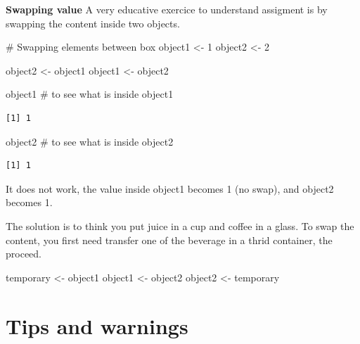 \documentclass[
  letterpaper,
  DIV=11,
  numbers=noendperiod]{scrreprt}
\newenvironment{Shaded}{\begin{snugshade}}{\end{snugshade}}
\newcommand{\CommentTok}[1]{\textcolor[rgb]{0.37,0.37,0.37}{#1}}
\newcommand{\DecValTok}[1]{\textcolor[rgb]{0.68,0.00,0.00}{#1}}
\newcommand{\NormalTok}[1]{\textcolor[rgb]{0.00,0.23,0.31}{#1}}
\newcommand{\OtherTok}[1]{\textcolor[rgb]{0.00,0.23,0.31}{#1}}
\begin{document}
\textbf{Swapping value} A very educative exercice to understand
assigment is by swapping the content inside two objects.

\begin{Shaded}
\begin{Highlighting}[]
\CommentTok{\# Swapping elements between box}
\NormalTok{object1 }\OtherTok{\textless{}{-}} \DecValTok{1}
\NormalTok{object2 }\OtherTok{\textless{}{-}} \DecValTok{2}

\NormalTok{object2 }\OtherTok{\textless{}{-}}\NormalTok{ object1}
\NormalTok{object1 }\OtherTok{\textless{}{-}}\NormalTok{ object2}

\NormalTok{object1 }\CommentTok{\# to see what is inside object1}
\end{Highlighting}
\end{Shaded}

\begin{verbatim}
[1] 1
\end{verbatim}

\begin{Shaded}
\begin{Highlighting}[]
\NormalTok{object2 }\CommentTok{\# to see what is inside object2}
\end{Highlighting}
\end{Shaded}

\begin{verbatim}
[1] 1
\end{verbatim}

It does not work, the value inside object1 becomes 1 (no swap), and
object2 becomes 1.

The solution is to think you put juice in a cup and coffee in a glass.
To swap the content, you first need transfer one of the beverage in a
thrid container, the proceed.

\begin{Shaded}
\begin{Highlighting}[]
\NormalTok{temporary }\OtherTok{\textless{}{-}}\NormalTok{ object1}
\NormalTok{object1 }\OtherTok{\textless{}{-}}\NormalTok{ object2}
\NormalTok{object2 }\OtherTok{\textless{}{-}}\NormalTok{ temporary}
\end{Highlighting}
\end{Shaded}

\section*{Tips and warnings}\label{tips-and-warnings-21}
\end{document}

